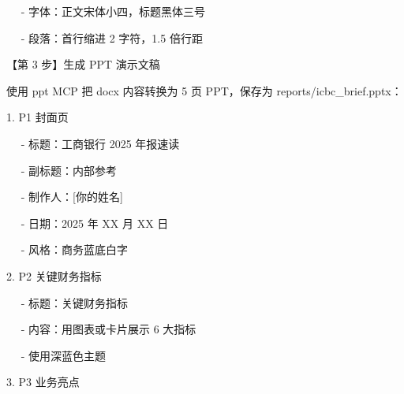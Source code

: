 \documentclass[
  american,
  chinese,
]{ctexart}
\begin{document}
\foreignlanguage{american}{{~~ }- }{字体：正文宋体小四，标题黑体三号}\foreignlanguage{american}{}

\foreignlanguage{american}{{~~ }- }{段落：首行缩进}\foreignlanguage{american}{ 2 }{字符，}\foreignlanguage{american}{1.5 }{{倍}}{行距}\foreignlanguage{american}{}

\foreignlanguage{american}{【第}\foreignlanguage{american}{ 3 }{\foreignlanguage{american}{步】生成}}\foreignlanguage{american}{ PPT }{\foreignlanguage{american}{演示文稿}}\foreignlanguage{american}{}

{\foreignlanguage{american}{使用}}\foreignlanguage{american}{ ppt MCP }\foreignlanguage{american}{把}\foreignlanguage{american}{ docx }{\foreignlanguage{american}{内容转换为}}\foreignlanguage{american}{ 5 }\foreignlanguage{american}{页}\foreignlanguage{american}{ {PPT{，保存为}}
reports/icbc\_brief.pptx}\foreignlanguage{american}{：}\foreignlanguage{american}{}

\foreignlanguage{american}{1. P1 }{\foreignlanguage{american}{封面页}}\foreignlanguage{american}{}

\foreignlanguage{american}{{~~ }- }{\foreignlanguage{american}{标题：工商银行}}\foreignlanguage{american}{ 2025 }{\foreignlanguage{american}{年报速读}}\foreignlanguage{american}{}

\foreignlanguage{american}{{~~ }}\foreignlanguage{american}{- }{副标题：内部参考}\foreignlanguage{american}{}

\foreignlanguage{american}{{~~ }- }{制作人：}\foreignlanguage{american}{{[}}{你的姓名}\foreignlanguage{american}{{]}}

\foreignlanguage{american}{{~~ }- }{日期：}\foreignlanguage{american}{2025 }{年}\foreignlanguage{american}{ XX }{月}\foreignlanguage{american}{ XX }{日}\foreignlanguage{american}{}

\foreignlanguage{american}{{~~ }- }{风格：商务蓝底白字}\foreignlanguage{american}{}

\foreignlanguage{american}{2. P2 }{关键财务指标}\foreignlanguage{american}{}

\foreignlanguage{american}{{~~ }- }{标题：关键财务指标}\foreignlanguage{american}{}

\foreignlanguage{american}{{~~ }- }{内容：用图表或卡片展示}\foreignlanguage{american}{ 6 }{大指标}\foreignlanguage{american}{}

\foreignlanguage{american}{{~~ }- }{使用深蓝色主题}\foreignlanguage{american}{}

\foreignlanguage{american}{3. P3 }{业务亮点}\foreignlanguage{american}{}
\end{document}
